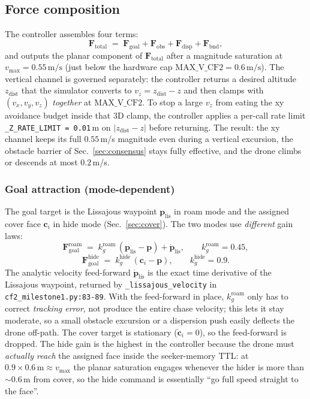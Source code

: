 \documentclass[11pt,a4paper]{article}
\newcommand{\code}[1]{\texttt{#1}}
\newcommand{\vect}[1]{\mathbf{#1}}
\begin{document}
\subsection{Force composition}

The controller assembles four terms:
\[
    \vect{F}_\mathrm{total}
    \;=\; \vect{F}_\mathrm{goal}
        + \vect{F}_\mathrm{obs}
        + \vect{F}_\mathrm{disp}
        + \vect{F}_\mathrm{bnd},
\]
and outputs the planar component of $\vect{F}_\mathrm{total}$ after a
magnitude saturation at $v_\mathrm{max} = 0.55\,\text{m/s}$ (just below the
hardware cap $\text{MAX\_V\_CF2} = 0.6\,\text{m/s}$). The vertical channel
is governed separately: the controller returns a desired altitude
$z_\mathrm{dist}$ that the simulator converts to $v_z = z_\mathrm{dist} - z$
and then clamps with $(v_x, v_y, v_z)$ \emph{together} at
$\text{MAX\_V\_CF2}$. To stop a large $v_z$ from eating the xy avoidance
budget inside that 3D clamp, the controller applies a per-call rate limit
\code{\_Z\_RATE\_LIMIT = 0.01}\,m on $|z_\mathrm{dist} - z|$ before
returning. The result: the xy channel keeps its full $0.55$\,m/s magnitude
even during a vertical excursion, the obstacle barrier of
Sec.~\ref{sec:consensus} stays fully effective, and the drone climbs or
descends at most $0.2$\,m/s.

\subsubsection*{Goal attraction (mode-dependent)}
The goal target is the Lissajous waypoint $\vect{p}_\mathrm{lis}$ in roam
mode and the assigned cover face $\vect{c}_i$ in hide mode
(Sec.~\ref{sec:cover}). The two modes use \emph{different} gain laws:
\[
    \vect{F}_\mathrm{goal}^\mathrm{roam}
    \;=\; k_g^\mathrm{roam}\,(\vect{p}_\mathrm{lis} - \vect{p})
       + \dot{\vect{p}}_\mathrm{lis},
    \qquad k_g^\mathrm{roam} = 0.45,
\]
\[
    \vect{F}_\mathrm{goal}^\mathrm{hide}
    \;=\; k_g^\mathrm{hide}\,(\vect{c}_i - \vect{p}),
    \qquad k_g^\mathrm{hide} = 0.9.
\]
The analytic velocity feed-forward $\dot{\vect{p}}_\mathrm{lis}$ is the
exact time derivative of the Lissajous waypoint, returned by
\code{\_lissajous\_velocity} in \code{cf2\_milestone1.py:83-89}. With the
feed-forward in place, $k_g^\mathrm{roam}$ only has to correct
\emph{tracking error}, not produce the entire chase velocity; this lets it
stay moderate, so a small obstacle excursion or a dispersion push easily
deflects the drone off-path. The cover target is stationary
($\dot{\vect{c}}_i = 0$), so the feed-forward is dropped. The hide gain is
the highest in the controller because the drone must \emph{actually reach}
the assigned face inside the seeker-memory TTL: at $0.9 \times 0.6\,\text{m}
\approx v_\mathrm{max}$ the planar saturation engages whenever the hider
is more than $\sim 0.6$\,m from cover, so the hide command is essentially
``go full speed straight to the face''.
\end{document}
